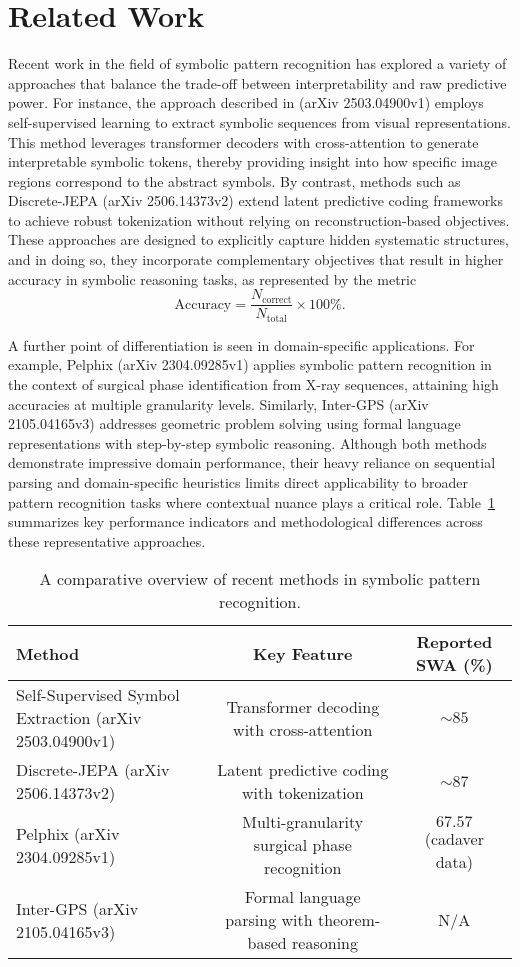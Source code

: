 \documentclass{article}
\begin{document}
\section{Related Work}
Recent work in the field of symbolic pattern recognition has explored a variety of approaches that balance the trade-off between interpretability and raw predictive power. For instance, the approach described in (arXiv 2503.04900v1) employs self-supervised learning to extract symbolic sequences from visual representations. This method leverages transformer decoders with cross-attention to generate interpretable symbolic tokens, thereby providing insight into how specific image regions correspond to the abstract symbols. By contrast, methods such as Discrete-JEPA (arXiv 2506.14373v2) extend latent predictive coding frameworks to achieve robust tokenization without relying on reconstruction-based objectives. These approaches are designed to explicitly capture hidden systematic structures, and in doing so, they incorporate complementary objectives that result in higher accuracy in symbolic reasoning tasks, as represented by the metric 
\[
\text{Accuracy} = \frac{N_{\text{correct}}}{N_{\text{total}}}\times100\%.
\]

A further point of differentiation is seen in domain-specific applications. For example, Pelphix (arXiv 2304.09285v1) applies symbolic pattern recognition in the context of surgical phase identification from X-ray sequences, attaining high accuracies at multiple granularity levels. Similarly, Inter-GPS (arXiv 2105.04165v3) addresses geometric problem solving using formal language representations with step-by-step symbolic reasoning. Although both methods demonstrate impressive domain performance, their heavy reliance on sequential parsing and domain-specific heuristics limits direct applicability to broader pattern recognition tasks where contextual nuance plays a critical role. Table~\ref{tab:literature} summarizes key performance indicators and methodological differences across these representative approaches.

\begin{table}[h]
\centering
\begin{tabular}{l|c|c}
\textbf{Method} & \textbf{Key Feature} & \textbf{Reported SWA (\%)} \\
\hline
Self-Supervised Symbol Extraction (arXiv 2503.04900v1) & Transformer decoding with cross-attention & $\sim85$ \\
Discrete-JEPA (arXiv 2506.14373v2) & Latent predictive coding with tokenization & $\sim87$ \\
Pelphix (arXiv 2304.09285v1) & Multi-granularity surgical phase recognition & $67.57$ (cadaver data) \\
Inter-GPS (arXiv 2105.04165v3) & Formal language parsing with theorem-based reasoning & N/A \\
\end{tabular}
\caption{A comparative overview of recent methods in symbolic pattern recognition.}
\label{tab:literature}
\end{table}
\end{document}
